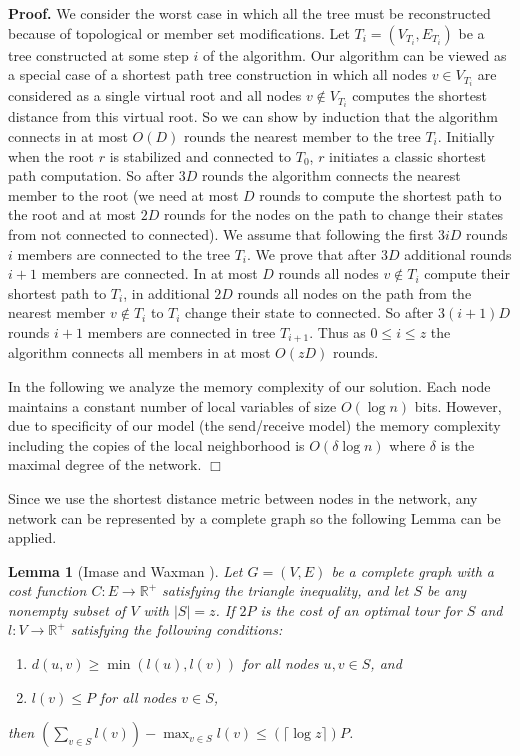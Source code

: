 \documentclass[11pt]{article}
\newtheorem{lemma}{Lemma}
\newenvironment{proof}{\noindent \begin{rm}{\textbf{Proof.} }}{\hspace*{\fill}$\Box$\par\end{rm} \vspace{.3cm}}
\begin{document}
\begin{proof}
We consider the worst case in which all the tree must be reconstructed
because of topological or member set modifications. Let
$T_i=(V_{T_i},E_{T_i})$ be a tree constructed at some step $i$ of the
algorithm. Our algorithm can be viewed as a special case of a shortest
path tree construction in which all nodes $v \in V_{T_i}$ are
considered as a single virtual root and all nodes $v \not \in V_{T_i}$
computes the shortest distance from this virtual root. So we can show
by induction that the algorithm connects in at most $O(D)$ rounds the
nearest member to the tree $T_i$. Initially when the root $r$ is
stabilized and connected to $T_0$, $r$ initiates a classic shortest
path computation. So after $3D$ rounds the algorithm connects the
nearest member to the root (we need at most $D$ rounds to compute the
shortest path to the root and at most $2D$ rounds for the nodes on the
path to change their states from not connected to connected). We
assume that following the first $3iD$ rounds $i$ members are connected
to the tree $T_i$. We prove that after $3D$ additional rounds $i+1$
members are connected. In at most $D$ rounds all nodes $v \not \in
T_i$ compute their shortest path to $T_i$, in additional $2D$ rounds
all nodes on the path from the nearest member $v \not \in T_i$ to
$T_i$ change their state to connected. So after $3(i+1)D$ rounds $i+1$
members are connected in tree $T_{i+1}$. Thus as $0 \leq i \leq z$ the
algorithm connects all members in at most $O(zD)$ rounds.

In the following we analyze the memory complexity of our solution.
Each node maintains a constant number of 
local variables of size $O(\log n)$ bits. However, due 
to specificity of our model (the send/receive model) the memory 
complexity including the copies of the local neighborhood is
$O(\delta \log n)$ where $\delta$ is the maximal degree of the network.
\end{proof}


 Since we use the shortest distance metric between nodes in the network, any network can be represented by a complete graph so the following Lemma can be applied.

\begin{lemma}[Imase and Waxman \cite{ImaseWaxman91}]
\label{lem:ImaseWaxman91}
Let $G=(V,E)$ be a complete graph with a cost function $C:E \rightarrow \mathbb{R}^+$ satisfying the triangle inequality, and let $S$ be any nonempty subset of $V$ with $|S|=z$. If $2P$ is the cost of an optimal tour for $S$ and $l:V \rightarrow \mathbb{R}^+$ satisfying the following conditions:
\begin{enumerate}
\item $d(u,v) \geq \min(l(u),l(v))$ for all nodes $u,v \in S$, and
\item $l(v) \leq P$ for all nodes $v \in S$,
\end{enumerate}
then $(\sum_{v \in S}l(v))-\max_{v \in S} l(v) \leq (\lceil \log z \rceil)P$.
\end{lemma}
\end{document}
